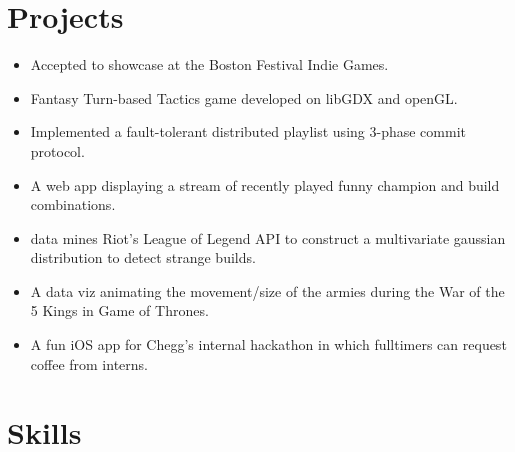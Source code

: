 \documentclass[10pt,letterpaper,sans]{moderncv}        %
\begin{document}
\section{Projects}
\begin{itemize}%
\item Accepted to showcase at the Boston Festival Indie Games.
\item Fantasy Turn-based Tactics game developed on libGDX and openGL.
\end{itemize}
\begin{itemize}
\item Implemented a fault-tolerant distributed playlist using 3-phase commit protocol.
\end{itemize}
\begin{itemize}
\item A web app displaying a stream of recently played funny champion and build combinations.
\item data mines Riot's League of Legend API to construct a multivariate gaussian distribution to detect strange builds.
\end{itemize}
\begin{itemize}
\item A data viz animating the movement/size of the armies during the War of the 5 Kings in Game of Thrones.
\end{itemize}
\begin{itemize}
\item A fun iOS app for Chegg's internal hackathon in which fulltimers can request coffee from interns.
\end{itemize}

\section{Skills}

\end{document}
